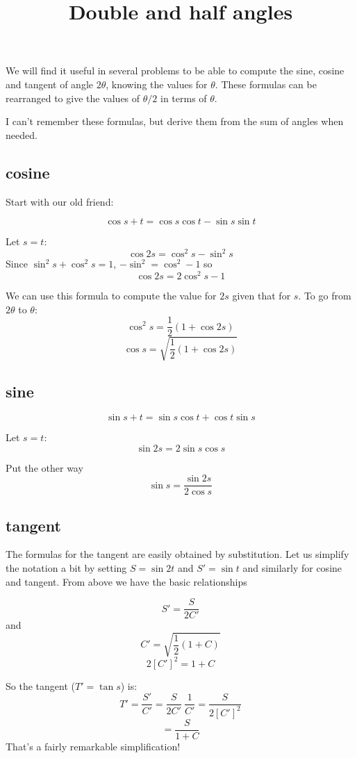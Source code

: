 \documentclass[11pt, oneside]{article}
\title{Double and half angles}
\date{}
\begin{document}
\maketitle
\Large

\label{sec:double_half_angles}

We will find it useful in several problems to be able to compute the sine, cosine and tangent of angle $2\theta$, knowing the values for $\theta$.  These formulas can be rearranged to give the values of $\theta/2$ in terms of $\theta$.

I can't remember these formulas, but derive them from the sum of angles when needed.

\subsection*{cosine}

Start with our old friend:

\[ \cos s + t = \cos s \cos t - \sin s \sin t \]

Let $s=t$:
\[ \cos 2s = \cos^2 s - \sin^2 s \]
Since $\sin^2 s + \cos^2 s = 1$, $-\sin^2 = \cos^2 - 1$ so
\[  \cos 2s = 2 \cos^2 s - 1 \]

We can use this formula to compute the value for $2s$ given that for $s$.  To go from $2\theta$ to $\theta$:
\[ \cos^2 s = \frac{1}{2}(1 + \cos 2s) \]
\[ \cos s = \sqrt{ \frac{1}{2}(1 + \cos 2s)} \]

\subsection*{sine}
\[ \sin s + t = \sin s \cos t + \cos t \sin s \]

Let $s = t$:
\[ \sin 2s = 2 \sin s \cos s \]

Put the other way
\[ \sin s = \frac{\sin 2s}{2 \cos s} \]

\subsection*{tangent}

The formulas for the tangent are easily obtained by substitution.  Let us simplify the notation a bit by setting $S = \sin 2t$ and $S' = \sin t$ and similarly for cosine and tangent.  From above we have the basic relationships

\[ S' = \frac{S}{2 C'} \]
and
\[ C' = \sqrt{\frac{1}{2} (1 + C)}  \]
\[ 2[C']^2 = 1 + C \]

So the tangent ($T' = \tan s$) is:
\[ T' = \frac{S'}{C'} = \frac{S}{2C'} \ \frac{1}{C'} = \frac{S}{2 [C']^2} \]
\[ = \frac{S}{1 + C} \]
That's a fairly remarkable simplification!
\end{document}
